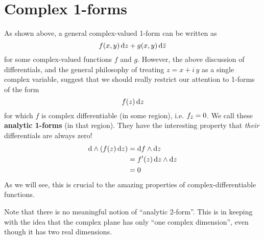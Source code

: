 \documentclass[12pt]{amsart}
\begin{document}
\section{Complex 1-forms}
\label{sec:complex-1-forms}

As shown above, a general complex-valued 1-form can be written as
\[f(x,y) \,{\mathrm{d} z} + g(x,y)\,{\mathrm{d} \bar{z}}\]
for some complex-valued functions $f$ and $g$.
However, the above discussion of differentials, and the general philosophy of treating $z=x+i\,y$ as a single complex variable, suggest that we should really restrict our attention to 1-forms of the form
\[ f(z)\,{\mathrm{d} z} \]
for which $f$ is complex differentiable (in some region), i.e. ${f}_{\bar{z}} = 0$.
We call these \textbf{analytic 1-forms} (in that region).
They have the interesting property that \emph{their} differentials are always zero!
\begin{align*}
  \mathrm{d}\wedge(f(z)\,{\mathrm{d} z}) &= {\mathrm{d} f} \wedge {\ensuremath{\mathrm{d} z}}\\
  &= f'(z)\, {\mathrm{d} z} \wedge {\ensuremath{\mathrm{d} z}}\\
  &= 0
\end{align*}
As we will see, this is crucial to the amazing properties of complex-differentiable functions.

Note that there is no meaningful notion of ``analytic 2-form''.
This is in keeping with the idea that the complex plane has only ``one complex dimension'', even though it has two real dimensions.
\end{document}
